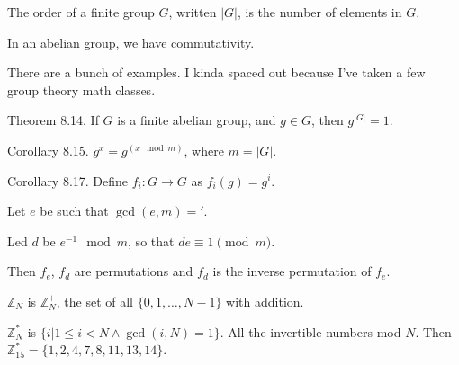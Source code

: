 \documentclass[12pt]{article}
\newcommand{\Z}{\mathbb{Z}}
\begin{document}
The order of a finite group $G$, written $|G|$, is the number of elements in $G$.

In an abelian group, we have commutativity.

There are a bunch of examples. I kinda spaced out because I've taken a few group theory math classes.

Theorem 8.14. If $G$ is a finite abelian group, and $g\in G$, then $g^{|G|}=1$.

Corollary 8.15. $g^x=g^{(x\mod{m})}$, where $m=|G|$.

Corollary 8.17. Define $f_i:G\to G$ as $f_i(g)=g^i$.

Let $e$ be such that $\gcd(e,m)='$.

Led $d$ be $e^{-1}\mod{m}$, so that $de\equiv1\pmod{m}$.

Then $f_e$, $f_d$ are permutations and $f_d$ is the inverse permutation of $f_e$.

$\Z_N$ is $\Z_N^+$, the set of all $\{0,1,\dots,N-1\}$ with addition.

$\Z_N^*$ is $\{i|1\leq i<N\wedge\gcd(i,N)=1\}$. All the invertible numbers mod $N$. Then $\Z_15^*=\{1,2,4,7,8,11,13,14\}$.
\end{document}
